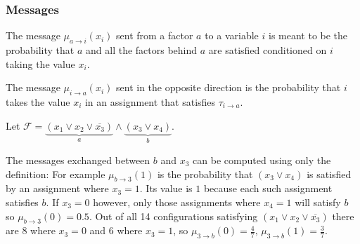 \subsubsection{Messages}

The message $\mu_{a \rightarrow i}(x_i)$ sent from a factor $a$ to a variable $i$ is meant to be the probability that $a$ and all the factors behind $a$ are satisfied conditioned on $i$ taking the value $x_i$. 


The message $\mu_{i \rightarrow a}(x_i)$ sent in the opposite direction is the probability that $i$ takes the value $x_i$ in an assignment that satisfies $\tau_{i \rightarrow a}$.

\begin{example}
Let $\mathcal{F} = \underbrace{(x_1 \lor x_2 \lor \overline{x_3})}_a  \land \underbrace{(x_3 \lor x_4)}_b $.

\begin{figure}[h]
\centering

\end{figure}
The messages exchanged between $b$ and $x_3$ can be computed using only the definition: \newline
For example $\mu_{b \rightarrow 3}(1)$ is the probability that $(x_3 \lor x_4)$ is satisfied by an assignment where $x_3 = 1$. Its value is $1$ because each such assignment satisfies $b$. If $x_3 = 0$ however, only those assignments where $x_4 = 1$ will satisfy $b$ so $\mu_{b \rightarrow 3}(0) = 0.5$. \newline
Out of all 14 configurations satisfying $(x_1 \lor x_2 \lor \overline{x_3})$ there are $8$ where $x_3 = 0$ and $6$ where $x_3 = 1$, so $\mu_{3 \rightarrow b}(0) = \frac{4}{7}, \, \mu_{3 \rightarrow b}(1) = \frac{3}{7}$.
\end{example}

